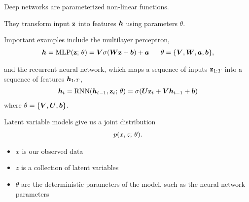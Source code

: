 \begin{frame}
Deep networks are parameterized non-linear functions. 
\air 

They transform input $\mathbf{z}$ into features $\boldsymbol{h}$ 
using parameters $\theta$. 

\pause

\vspace{0.5cm}
Important examples include the multilayer perceptron,
\begin{align*}
\boldsymbol{h} = \operatorname*{MLP}(\mathbf{z} ; \, \theta) = \boldsymbol{V} \sigma (\boldsymbol{W}  \mathbf{z} + \boldsymbol{b}) + \boldsymbol{a} \ \ \ \ \  \theta = \{ \boldsymbol{V}, \boldsymbol{W},  \boldsymbol{a}, \boldsymbol{b}\},
\end{align*}

\pause 
and the recurrent neural network, which maps a sequence of inputs $\mathbf{z}_{1:T}$ into a sequence of features $\boldsymbol{h}_{1:T}$,
\begin{align*}
\boldsymbol{h}_{t} =  \operatorname*{RNN}(\boldsymbol{h}_{t-1}, \mathbf{z}_t ; \, \theta) = \sigma (\boldsymbol{U}  \mathbf{z}_t + \boldsymbol{V} \boldsymbol{h}_{t-1} + \boldsymbol{b})
\end{align*}
where $ \theta = \{ \boldsymbol{V}, \boldsymbol{U}, \boldsymbol{b}\}$.

\end{frame}


\begin{frame}

Latent variable models give us a joint distribution
\begin{align*}
p(x, z ; \, \theta).
\end{align*}

\pause
\begin{itemize}
    \item $x$ is our observed data
    \item $z$ is a collection of latent variables
    \item $\theta$ are the deterministic parameters of the model, such as the neural network parameters
\end{itemize}
\end{frame}


